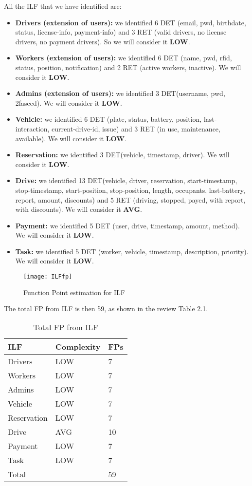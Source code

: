 All the ILF that we have identified are:
\begin{itemize}
\item \textbf{Drivers (extension of users):} we identified 6 DET (email, pwd, birthdate, status, license-info, payment-info) and 3 RET (valid drivers, no license drivers, no payment drivers). So we will consider it \textbf{LOW}.
\item \textbf{Workers (extension of users):} we identified 6 DET (name, pwd, rfid, status, position, notification) and 2 RET (active workers, inactive). We will consider it \textbf{LOW}.
\item \textbf{Admins (extension of users):} we identified 3 DET(username, pwd, 2faseed). We will consider it \textbf{LOW}.
\item \textbf{Vehicle:} we identified 6 DET (plate, status, battery, position, last-interaction, current-drive-id, issue) and 3 RET (in use, maintenance, available). We will consider it \textbf{LOW}.
\item \textbf{Reservation:} we identified 3 DET(vehicle, timestamp, driver). We will consider it \textbf{LOW}.
\item \textbf{Drive:} we identified 13 DET(vehicle, driver, reservation, start-timestamp, stop-timestamp, start-position, stop-position, length, occupants, last-battery, report, amount, discounts) and 5 RET (driving, stopped, payed, with report, with discounts). We will consider it \textbf{AVG}.
\item \textbf{Payment:} we identified 5 DET (user, drive, timestamp, amount, method). We will consider it \textbf{LOW}.
\item \textbf{Task:} we identified 5 DET (worker, vehicle, timestamp, description, priority). We will consider it \textbf{LOW}.
\end{itemize}

\begin{figure}
  \centering
  \texttt{[image: ILFfp]}
  \caption{Function Point estimation for ILF}
\end{figure}

The total FP from ILF is then 59, as shown in the review Table 2.1. 

\begin{table}
  \centering
    \begin{tabular}{| l | l | l |}
    \hline
    \textbf{ILF} & \textbf{Complexity} & \textbf{FPs} \\ \hline
    Drivers & LOW & 7 \\ \hline
    Workers & LOW & 7\\ \hline
    Admins & LOW & 7\\ \hline
    Vehicle & LOW & 7\\ \hline
    Reservation & LOW & 7\\ \hline
    Drive & AVG & 10\\ \hline
    Payment & LOW & 7\\ \hline
    Task & LOW & 7\\ \hline 
    \hline
    \multicolumn{2}{|l|}{Total} & 59 \\ \hline
    \end{tabular}
  \caption{Total FP from ILF}
\end{table}

